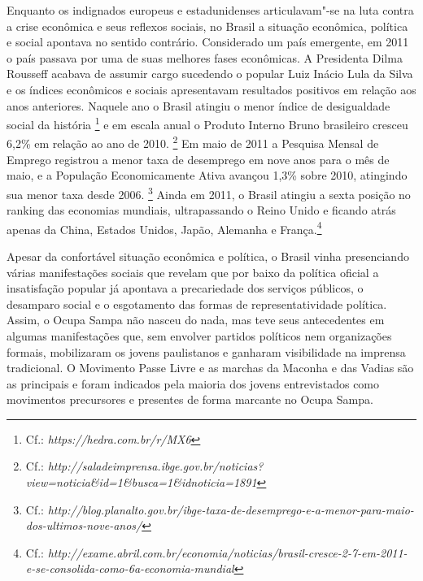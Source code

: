 \noindent{}Enquanto os indignados europeus e estadunidenses articulavam"-se na luta
contra a crise econômica e seus reflexos sociais, no Brasil a situação
econômica, política e social apontava no sentido contrário. Considerado
um país emergente, em 2011 o país passava por uma de suas melhores fases
econômicas. A Presidenta Dilma Rousseff acabava de assumir cargo
sucedendo o popular Luiz Inácio Lula da Silva e os índices econômicos e
sociais apresentavam resultados positivos em relação aos anos
anteriores. Naquele ano o Brasil atingiu o menor índice de desigualdade
social da história \footnote{Cf.:
  \emph{https://hedra.com.br/r/MX6}}
e em escala anual o Produto Interno Bruno brasileiro cresceu 6,2\% em
relação ao ano de 2010. \footnote{Cf.:
  \emph{http://saladeimprensa.ibge.gov.br/noticias?view=noticia\&id=1\&busca=1\&idnoticia=1891}}%
Em maio de 2011 a Pesquisa Mensal de Emprego registrou a menor taxa de
desemprego em nove anos para o mês de maio, e a População Economicamente
Ativa avançou 1,3\% sobre 2010, atingindo sua menor taxa desde 2006.
\footnote{Cf.:
  \emph{http://blog.planalto.gov.br/ibge-taxa-de-desemprego-e-a-menor-para-maio-dos-ultimos-nove-anos/}}
Ainda em 2011, o Brasil atingiu a sexta posição no ranking das economias
mundiais, ultrapassando o Reino Unido e ficando atrás apenas da China,
Estados Unidos, Japão, Alemanha e França.\footnote{Cf.:
  \emph{http://exame.abril.com.br/economia/noticias/brasil-cresce-2-7-em-2011-e-se-consolida-como-6a-economia-mundial}}

Apesar da confortável situação econômica e política, o Brasil vinha
presenciando várias manifestações sociais que revelam que por baixo da
política oficial a insatisfação popular já apontava a precariedade dos
serviços públicos, o desamparo social e o esgotamento das formas de
representatividade política. Assim, o Ocupa Sampa não nasceu do nada,
mas teve seus antecedentes em algumas manifestações que, sem envolver
partidos políticos nem organizações formais, mobilizaram os jovens
paulistanos e ganharam visibilidade na imprensa tradicional. O Movimento
Passe Livre e as marchas da Maconha e das Vadias são as principais e
foram indicados pela maioria dos jovens entrevistados como movimentos
precursores e presentes de forma marcante no Ocupa Sampa.

